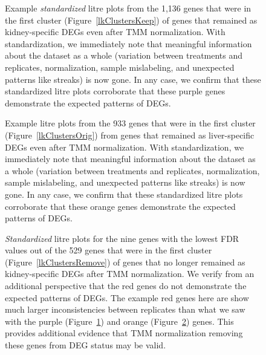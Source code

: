 \documentclass{bmcart}
\begin{document}
\begin{linenumbers}
\begin{backmatter}
\begin{figure}[h!]
\caption{
Example \textit{standardized} litre plots from the 1,136 genes that were in the first cluster (Figure~\ref{lkClustersKeep}) of genes that remained as kidney-specific DEGs even after TMM normalization. With standardization, we immediately note that meaningful information about the dataset as a whole (variation between treatments and replicates, normalization, sample mislabeling, and unexpected patterns like streaks) is now gone. In any case, we confirm that these standardized litre plots corroborate that these purple genes demonstrate the expected patterns of DEGs.
\label{litreClusterKeep-St}}
\end{figure}

\begin{figure}[h!]
\caption{
Example litre plots from the 933 genes that were in the first cluster (Figure~\ref{lkClustersOrig}) from genes that remained as liver-specific DEGs even after TMM normalization. With standardization, we immediately note that meaningful information about the dataset as a whole (variation between treatments and replicates, normalization, sample mislabeling, and unexpected patterns like streaks) is now gone. In any case, we confirm that these standardized litre plots corroborate that these orange genes demonstrate the expected patterns of DEGs.
\label{litreClusterOrig-St}}
\end{figure}

\begin{figure}[h!]
\caption{
\textit{Standardized} litre plots for the nine genes with the lowest FDR values out of the 529 genes that were in the first cluster (Figure~\ref{lkClustersRemove}) of genes that no longer remained as kidney-specific DEGs after TMM normalization. We verify from an additional perspective that the red genes do not demonstrate the expected patterns of DEGs. The example red genes here are show much larger inconsistencies between replicates than what we saw with the purple (Figure~\ref{litreClusterKeep-St}) and orange (Figure~\ref{litreClusterOrig-St}) genes. This provides additional evidence that TMM normalization removing these genes from DEG status may be valid.
\label{litreClusterRemove-St}}
\end{figure}


\end{backmatter}
\end{linenumbers}
\end{document}

